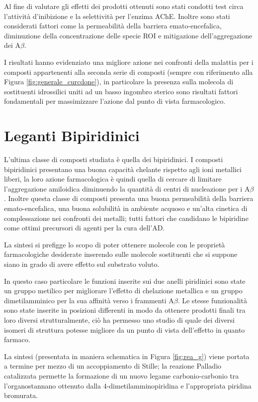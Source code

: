 \documentclass[a4paper, 11pt]{article}
\begin{document}
Al fine di valutare gli effetti dei prodotti ottenuti sono stati condotti test circa l'attività d'inibizione e la selettività per l'enzima AChE. Inoltre sono stati considerati fattori come la permeabilità della barriera emato-encefalica, diminuzione della concentrazione delle specie ROI e mitigazione dell'aggregazione dei A$\beta$.

I risultati hanno evidenziato una migliore azione nei confronti della malattia per i composti appartenenti alla seconda serie di composti (sempre con riferimento alla Figura \ref{fig:generale_curcdone}), in particolare la presenza sulla molecola di sostituenti idrossilici uniti ad un basso ingombro sterico sono risultati fattori fondamentali per massimizzare l'azione dal punto di vista farmacologico. \cite{jun_yan_design_2017}

\section{Leganti Bipiridinici}
L'ultima classe di composti studiata è quella dei bipiridinici. I composti bipiridinici presentano una buona capacità chelante rispetto agli ioni metallici liberi, la loro azione farmacologica è quindi quella di cercare di limitare l'aggregazione amiloidica diminuendo la quantità di centri di nucleazione per i A$\beta$. Inoltre questa classe di composti presenta una buona permeabilità della barriera emato-encefalica, una buona solubilità in ambiente acquoso e un'alta cinetica di complessazione nei confronti dei metalli; tutti fattori che candidano le bipiridine come ottimi precursori di agenti per la cura dell'AD.

La sintesi si prefigge lo scopo di poter ottenere molecole con le proprietà farmacologiche desiderate inserendo sulle molecole sostituenti che si suppone siano in grado di avere effetto sul substrato voluto.

In questo caso particolare le funzioni inserite sui due anelli piridinici sono state un gruppo metilico per migliorare l'effetto di chelazione metallica e un gruppo dimetilamminico per la sua affinità verso i frammenti A$\beta$. Le stesse funzionalità sono state inserite in posizioni differenti in modo da ottenere prodotti finali tra loro diversi strutturalmente, ciò ha permesso uno studio di quale dei diversi isomeri di struttura potesse migliore da un punto di vista dell'effetto in quanto farmaco.

La sintesi (presentata in maniera schematica in Figura \ref{fig:rea_g}) viene portata a termine per mezzo di un accoppiamento di Stille; la reazione Palladio catalizzata permette la formazione di un nuovo legame carbonio-carbonio tra l'organostannano ottenuto dalla 4-dimetilamminopiridina e l'appropriata piridina bromurata.
\end{document}

